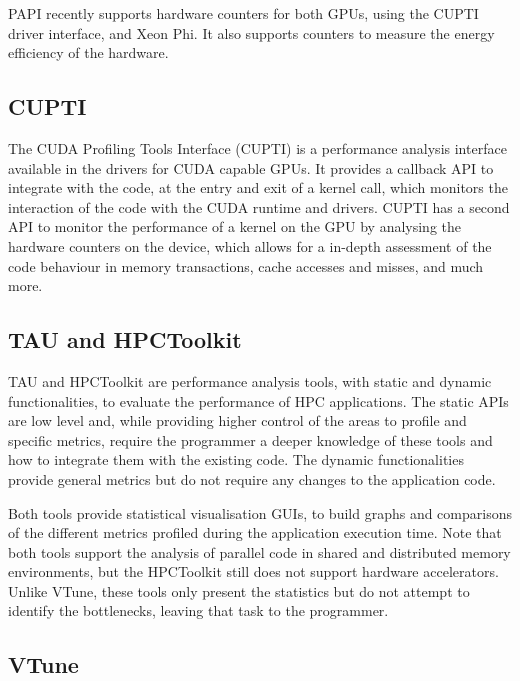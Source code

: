 PAPI recently supports hardware counters for both \nvidia GPUs, using the \nvidia CUPTI driver interface, and \intel Xeon Phi. It also supports counters to measure the energy efficiency of the hardware.

\subsection*{\nvidia CUPTI}

The \nvidia CUDA Profiling Tools Interface (CUPTI) \cite{NVIDIA:CUPTI} is a performance analysis interface available in the \nvidia drivers for CUDA capable GPUs. It provides a callback API to integrate with the code, at the entry and exit of a kernel call, which monitors the interaction of the code with the CUDA runtime and drivers. CUPTI has a second API to monitor the performance of a kernel on the GPU by analysing the hardware counters on the device, which allows for a in-depth assessment of the code behaviour in memory transactions, cache accesses and misses, and much more.

\subsection*{TAU and HPCToolkit}

TAU \cite{TAU} and HPCToolkit \cite{HPCToolkit} are performance analysis tools, with static and dynamic functionalities, to evaluate the performance of HPC applications. The static APIs are low level and, while providing higher control of the areas to profile and specific metrics, require the programmer a deeper knowledge of these tools and how to integrate them with the existing code. The dynamic functionalities provide general metrics but do not require any changes to the application code.

Both tools provide statistical visualisation GUIs, to build graphs and comparisons of the different metrics profiled during the application execution time. Note that both tools support the analysis of parallel code in shared and distributed memory environments, but the HPCToolkit still does not support hardware accelerators. Unlike VTune, these tools only present the statistics but do not attempt to identify the bottlenecks, leaving that task to the programmer.

\subsection*{VTune}

